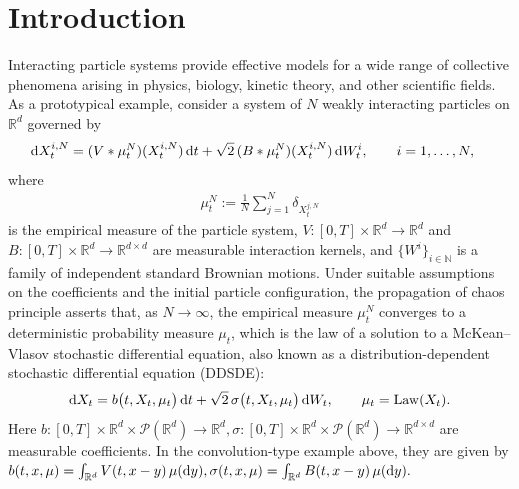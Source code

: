 \documentclass[UTF-8,reqno]{amsart}
\numberwithin{equation}{section}
\theoremstyle{definition}
\def\dif{{\mathord{{\rm d}}}}
\def\dif{{\mathord{{\rm d}}}}
\begin{document}

\date{\today}

\maketitle



\tableofcontents



\section{Introduction}

Interacting particle systems provide effective models for a wide range of
collective phenomena arising in physics, biology, kinetic theory, and other
scientific fields. As a prototypical example, consider a system of $N$ weakly
interacting particles on $\mathbb{R}^d$ governed by
\begin{align}
\dif X_t^{i,N}
&=
(V*\mu_t^N)(X_t^{i,N})\,\dif t
+
\sqrt{2}\,
(B*\mu_t^N)(X_t^{i,N})\,\dif W_t^i,
\qquad
i=1,\ldots,N,
\notag
\end{align}
where
\begin{align*}
\mu_t^N
:=
\frac1N\sum_{j=1}^N\delta_{X_t^{j,N}}
\end{align*}
is the empirical measure of the particle system,
$V:[0,T]\times\mathbb{R}^d\to\mathbb{R}^d$ and
$B:[0,T]\times\mathbb{R}^d\to\mathbb{R}^{d\times d}$ are measurable
interaction kernels, and $\{W^i\}_{i\in\mathbb{N}}$ is a family of independent
standard   Brownian motions. 
Under suitable assumptions on the coefficients and the initial particle
configuration, the propagation of chaos principle asserts that, as
$N\to\infty$, the empirical measure $\mu_t^N$ converges to a deterministic
probability measure $\mu_t$, which is the law of a solution to a
McKean--Vlasov stochastic differential equation, also known as a
distribution-dependent stochastic differential equation (DDSDE):
\begin{align}
\dif X_t
=
b\bigl(t,X_t,\mu_t\bigr)\,\dif t
+
\sqrt{2}\,
\sigma\bigl(t,X_t,\mu_t\bigr)\,\dif W_t,
\qquad
\mu_t=\operatorname{Law}(X_t).
\label{eq:sde}
\end{align}
Here
$
b:[0,T]\times\mathbb{R}^d\times\mathcal P(\mathbb{R}^d)
\to\mathbb{R}^d,
\sigma:[0,T]\times\mathbb{R}^d\times\mathcal P(\mathbb{R}^d)
\to\mathbb{R}^{d\times d}
$
are measurable coefficients. In the convolution-type example above, they are
given by
$
b(t,x,\mu)=
\int_{\mathbb{R}^d}
V(t,x-y)\,\mu(\dif y), 
\sigma(t,x,\mu)=
\int_{\mathbb{R}^d}
B(t,x-y)\,\mu(\dif y).
$ 
 
\end{document}
